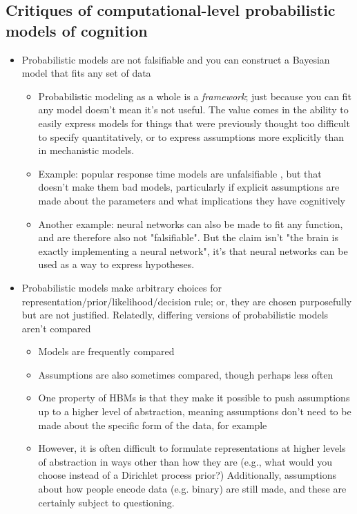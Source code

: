 \documentclass[12pt]{article}
\begin{document}
\begin{itemize}
\end{itemize}

\subsection*{Critiques of computational-level probabilistic models of cognition}

\begin{itemize}

\item Probabilistic models are not falsifiable and you can construct a Bayesian model that fits any set of data \citep{Jones2011,Marcus2013,Jones2014}
    \begin{itemize}
    \item Probabilistic modeling as a whole is a \textit{framework}; just because you can fit any model doesn't mean it's not useful. The value comes in the ability to easily express models for things that were previously thought too difficult to specify quantitatively, or to express assumptions more explicitly than in mechanistic models.
    \item Example: popular response time models are unfalsifiable \citep{Jones2014}, but that doesn't make them bad models, particularly if explicit assumptions are made about the parameters and what implications they have cognitively
    \item Another example: neural networks can also be made to fit any function, and are therefore also not "falsifiable". But the claim isn't "the brain is exactly implementing a neural network", it's that neural networks can be used as a way to express hypotheses.
    \end{itemize}

\item Probabilistic models make arbitrary choices for representation/prior/likelihood/decision rule; or, they are chosen purposefully but are not justified. Relatedly, differing versions of probabilistic models aren't compared \citep{Jones2011,Marcus2013}
    \begin{itemize}
    \item Models are frequently compared \citep{Tenenbaum2001,Weiss2002,Kording2004,Lewandowsky2009}
    \item Assumptions are also sometimes compared, though perhaps less often \citep{Kemp2008,Griffiths2009}
    \item One property of HBMs is that they make it possible to push assumptions up to a higher level of abstraction, meaning assumptions don't need to be made about the specific form of the data, for example \citep{Kemp2008,Kemp2010}
    \item However, it is often difficult to formulate representations at higher levels of abstraction in ways other than how they are (e.g., what would you choose instead of a Dirichlet process prior?) Additionally, assumptions about how people encode data (e.g. binary) are still made, and these are certainly subject to questioning.
    \end{itemize}


\end{itemize}
\end{document}
